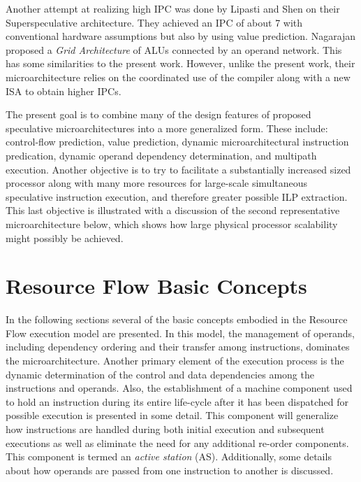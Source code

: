 \documentclass{book}
\begin{document}
Another attempt at realizing high IPC was done by
Lipasti and Shen on their Superspeculative
architecture. \cite{Lip97}  They achieved an IPC of
about 7 with conventional hardware assumptions but
also by using value prediction.
Nagarajan proposed a {\em Grid Architecture} of ALUs
connected by an operand network. \cite{Nag01}  
This has some similarities to the present work.
However, unlike the present work, their microarchitecture
relies on the coordinated use of the compiler along with
a new ISA to obtain higher IPCs.

The present goal is to combine many of the design features of
proposed speculative microarchitectures into a more 
generalized form.
These include: control-flow prediction, value prediction,
dynamic microarchitectural instruction predication, dynamic
operand dependency determination, and
multipath execution.
Another objective is to try to facilitate a substantially
increased sized processor along with many more 
resources for large-scale simultaneous speculative
instruction execution, and therefore greater possible ILP
extraction.
This last objective is illustrated with a discussion of
the second representative microarchitecture below, which
shows how large physical processor scalability might
possibly be achieved.
%
%
\section{Resource Flow Basic Concepts}
%
In the following sections several of the
basic concepts embodied in the Resource Flow execution model are
presented.
In this model, the management of operands, including
dependency ordering and their transfer among instructions, dominates
the microarchitecture.
Another primary element of the execution process is the
dynamic determination of the control and data dependencies
among the instructions and operands.
Also, the establishment of a machine component used 
to hold an instruction during its entire life-cycle after it
has been dispatched for possible execution is presented in some detail.
This component will generalize how instructions are handled
during both initial execution and subsequent executions as well
as eliminate the need for any additional re-order components.
This component is termed an \textit{active station} (AS).
Additionally, some details about how operands are passed 
from one instruction to
another is discussed.
%
%
\end{document}
